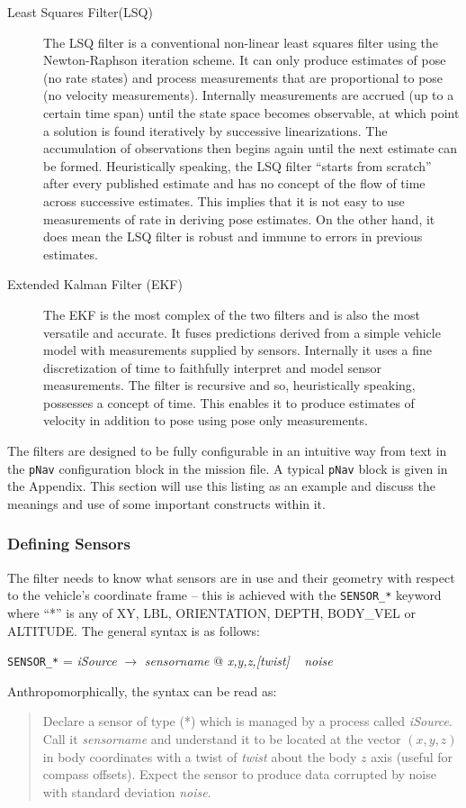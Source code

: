 \documentclass[a4paper,10pt]{article}
\newcommand{\Code}[1]{\texttt{#1} }
\newcommand{\code}[1]{\Code{#1} }
\begin{document}
\begin{description}
\item [Least Squares Filter(LSQ)] The LSQ filter is a conventional
non-linear least squares filter using the Newton-Raphson iteration
scheme. It can only produce estimates of pose (no rate states) and
process measurements that are proportional to pose (no velocity
measurements). Internally measurements are accrued (up to a certain
time span) until the state space becomes observable, at which point
a solution is found iteratively by successive linearizations. The
accumulation of observations then begins again until the next
estimate can be formed. Heuristically speaking, the LSQ filter
``starts from scratch'' after every published estimate and has no
concept of the flow of time across successive estimates. This
implies that it is not easy to use measurements of rate  in
deriving pose estimates. On the other hand, it does mean the LSQ
filter is robust and immune to errors in previous estimates.

\item[Extended Kalman Filter (EKF)] The EKF is the most complex of the two filters and is also
the most versatile and accurate. It fuses predictions derived
from a simple vehicle model with measurements supplied by sensors.
Internally it uses a fine discretization of time to faithfully
interpret and model sensor measurements. The filter is recursive
and so, heuristically speaking, possesses a concept of time. This
enables it to produce estimates of velocity in addition  to pose using pose only measurements.
\end{description}

The filters are designed to be fully configurable in an intuitive
way from text in the \code{pNav} configuration block in the
mission file. A typical \code{pNav} block is given in the
Appendix. This section will use this listing as an example and
discuss the meanings and use of some important constructs within it.


\subsubsection{Defining Sensors}
The filter needs to know what sensors are in use and their
geometry with respect to the vehicle's coordinate frame -- this is
achieved with the \code{SENSOR\_*} keyword where ``*'' is any of
XY, LBL, ORIENTATION, DEPTH, BODY\_VEL or ALTITUDE. The general
syntax is as follows:
\begin{center}
\code{SENSOR\_*} = {\it{iSource}} $\rightarrow$ {\it{sensorname}}
@ {\it{x,y,z,[twist]}} ~ {\it{noise}}\\
\end{center} Anthropomorphically, the syntax can be read as:
\begin{quote}
Declare a sensor of type (*) which is managed by a process called
{\it{iSource}}. Call it {\it{sensorname}} and understand it to be
located at the vector $(x,y,z)$ in body coordinates with a twist
of {\it{twist}} about the body $z$ axis (useful for compass
offsets). Expect the sensor to produce data corrupted by noise
with standard deviation {\it{noise}}.
\end{quote}
\end{document}
